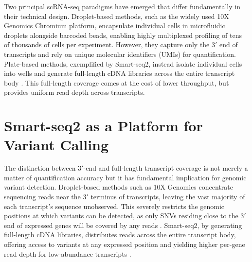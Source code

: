Two principal scRNA-seq paradigms have emerged that differ fundamentally in their technical design. 
Droplet-based methods, such as the widely used 10X Genomics Chromium platform, encapsulate individual cells in microfluidic droplets alongside barcoded beads, enabling highly multiplexed profiling of tens of thousands of cells per experiment. 
However, they capture only the 3$'$ end of transcripts and rely on unique molecular identifiers (UMIs) for quantification. 
Plate-based methods, exemplified by Smart-seq2, instead isolate individual cells into wells and generate full-length cDNA libraries across the entire transcript body \parencite{PicelFulllengthRNAseq2014, WangDirectComparative2021}.
This full-length coverage comes at the cost of lower throughput, but provides uniform read depth across transcripts.

\section{Smart-seq2 as a Platform for Variant Calling}



The distinction between 3$'$-end and full-length transcript coverage is not merely a matter of quantification accuracy but it has fundamental implication for genomic variant detection.  Droplet-based methods such as 10X Genomics concentrate sequencing reads near the 3$'$ terminus of transcripts, leaving the vast majority of each transcript's sequence unobserved. 
This severely restricts the genomic positions at which variants can be detected, as only SNVs residing close to the 3$'$ end of expressed genes will be covered by any reads \parencite{WangDirectComparative2021}. Smart-seq2, by generating full-length cDNA libraries, distributes reads across the entire transcript body, offering access to variants at any expressed position and yielding higher per-gene read depth for low-abundance transcripts \parencite{PicelFulllengthRNAseq2014, WangDirectComparative2021}.

